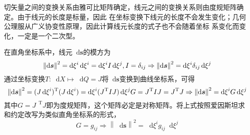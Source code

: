 \documentclass[UTF8]{ctexart}
\newcommand{\dif}{\mathop{}\!\mathrm{d}}
\newcommand{\tr}{\mathop{}\!\mathrm{T}}
\begin{document}
切矢量之间的变换关系由雅可比矩阵确定，线元之间的变换关系则由度规矩阵确定。由于线元的长度是标量，因此
在坐标变换下线元的长度不会发生变化；几何公理服从广义协变性原理，因此计算线元长度的式子也不会随着坐标
系变化而变化，一定是一个二次型。

在直角坐标系中，线元$\dif \boldsymbol{s}$的模方为
\begin{equation}
  \left\|\dif \boldsymbol{s} \right\|^{2}=\dif \xi^{i}\dif \xi^{i}=\dif \xi^{i}I\dif \xi^{j}, \\
  I=\delta_{ij} \Rightarrow \left\|\dif \boldsymbol{s} \right\|^{2}=\dif \xi^{i}\delta_{ij}\dif \xi^{j}
\end{equation}
通过坐标变换$T: \dif X\mapsto\dif Q=J$将$\dif \boldsymbol{s}$变换到曲线坐标系，可得
\begin{equation}
  \left\|\dif \boldsymbol{s} \right\|^{2}=(J\dif \xi^{i})^{\tr} (J\dif\xi^{i})=\dif \xi^{i}(J^{\tr}IJ)\dif \xi^{j} \\
  G=J^{\tr}IJ=J^{\tr}J\Rightarrow \left\|\dif \boldsymbol{s} \right\|^{2}=\dif \xi^{i}G\dif \xi^{j}
\end{equation}
其中$G=J^{\tr}J$即为度规矩阵，这个矩阵必定是对称矩阵。将上式按照爱因斯坦求和约定改写为类似直角坐标系的形式，
\begin{equation}
  G=g_{ij}\Rightarrow\left\|\dif \boldsymbol{s} \right\|^{2}=\dif \xi^{i}g_{ij}\dif \xi^{j}
\end{equation}
\end{document}

